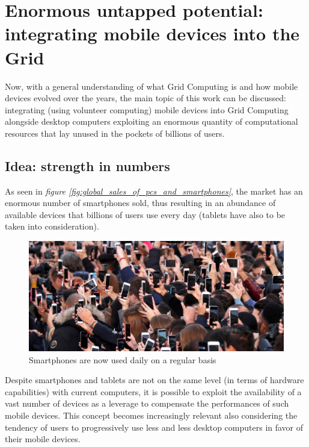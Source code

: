 \section{Enormous untapped potential: integrating mobile devices into the Grid}\label{untapped_enormous_potential}
Now, with a general understanding of what Grid Computing is and how mobile devices evolved over the years, the main topic of this work can be discussed: integrating (using volunteer computing) mobile devices into Grid Computing alongside desktop computers exploiting an enormous quantity of computational resources that lay unused in the pockets of billions of users.

\subsection{Idea: strength in numbers}
As seen in \textit{figure \ref{fig:global_sales_of_pcs_and_smartphones}}, the market has an enormous number of smartphones sold, thus resulting in an abundance of available devices that billions of users use every day (tablets have also to be taken into consideration).
\vspace{10mm}

\begin{figure}[!ht]
    \centering
    \includegraphics[scale=1.2]{document/chapters/chapter_1/images/people_using_smartphones.jpg}
    \caption{Smartphones are now used daily on a regular basis}
    \label{fig:people_using_smartphones}
\end{figure}

Despite smartphones and tablets are not on the same level (in terms of hardware capabilities) with current computers, it is possible to exploit the availability of a vast number of devices as a leverage to compensate the performances of such mobile devices.
This concept becomes increasingly relevant also considering the tendency of users to progressively use less and less desktop computers in favor of their mobile devices.

